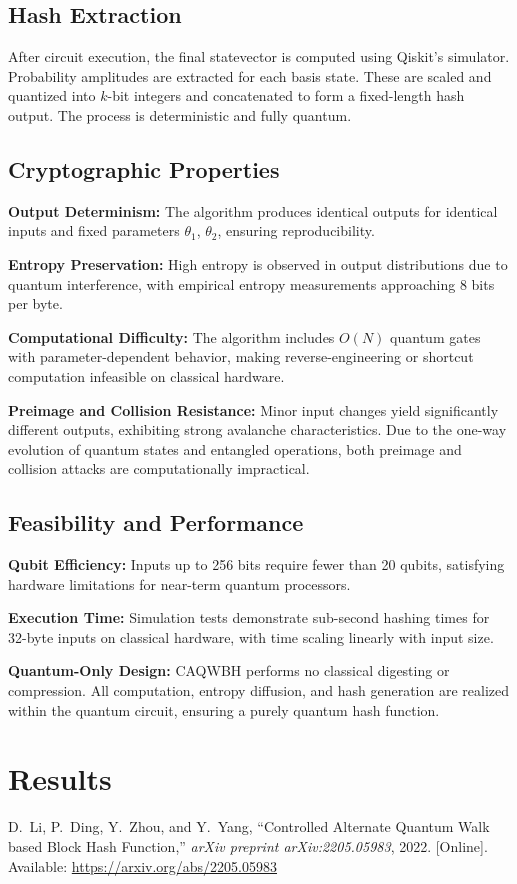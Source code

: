 \documentclass[conference]{IEEEtran}
\begin{document}
\subsection{Hash Extraction}

After circuit execution, the final statevector is computed using Qiskit's simulator. Probability amplitudes are extracted for each basis state. These are scaled and quantized into $k$-bit integers and concatenated to form a fixed-length hash output. The process is deterministic and fully quantum.

\subsection{Cryptographic Properties}

\textbf{Output Determinism:} The algorithm produces identical outputs for identical inputs and fixed parameters $\theta_1$, $\theta_2$, ensuring reproducibility.

\textbf{Entropy Preservation:} High entropy is observed in output distributions due to quantum interference, with empirical entropy measurements approaching 8 bits per byte.

\textbf{Computational Difficulty:} The algorithm includes $O(N)$ quantum gates with parameter-dependent behavior, making reverse-engineering or shortcut computation infeasible on classical hardware.

\textbf{Preimage and Collision Resistance:} Minor input changes yield significantly different outputs, exhibiting strong avalanche characteristics. Due to the one-way evolution of quantum states and entangled operations, both preimage and collision attacks are computationally impractical.

\subsection{Feasibility and Performance}

\textbf{Qubit Efficiency:} Inputs up to 256 bits require fewer than 20 qubits, satisfying hardware limitations for near-term quantum processors.

\textbf{Execution Time:} Simulation tests demonstrate sub-second hashing times for 32-byte inputs on classical hardware, with time scaling linearly with input size.

\textbf{Quantum-Only Design:} CAQWBH performs no classical digesting or compression. All computation, entropy diffusion, and hash generation are realized within the quantum circuit, ensuring a purely quantum hash function.

\section{Results}

\begin{thebibliography}{1}

D.~Li, P.~Ding, Y.~Zhou, and Y.~Yang, ``Controlled Alternate Quantum Walk based Block Hash Function,'' \textit{arXiv preprint arXiv:2205.05983}, 2022. [Online]. Available: \url{https://arxiv.org/abs/2205.05983}

\end{thebibliography}
\end{document}
